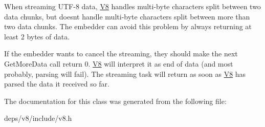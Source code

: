 When streaming U\+T\+F-\/8 data, \hyperlink{classv8_1_1_v8}{V8} handles multi-\/byte characters split between two data chunks, but doesn\textquotesingle{}t handle multi-\/byte characters split between more than two data chunks. The embedder can avoid this problem by always returning at least 2 bytes of data.

If the embedder wants to cancel the streaming, they should make the next Get\+More\+Data call return 0. \hyperlink{classv8_1_1_v8}{V8} will interpret it as end of data (and most probably, parsing will fail). The streaming task will return as soon as \hyperlink{classv8_1_1_v8}{V8} has parsed the data it received so far. 

The documentation for this class was generated from the following file\+:\begin{DoxyCompactItemize}
\item 
deps/v8/include/v8.\+h\end{DoxyCompactItemize}
